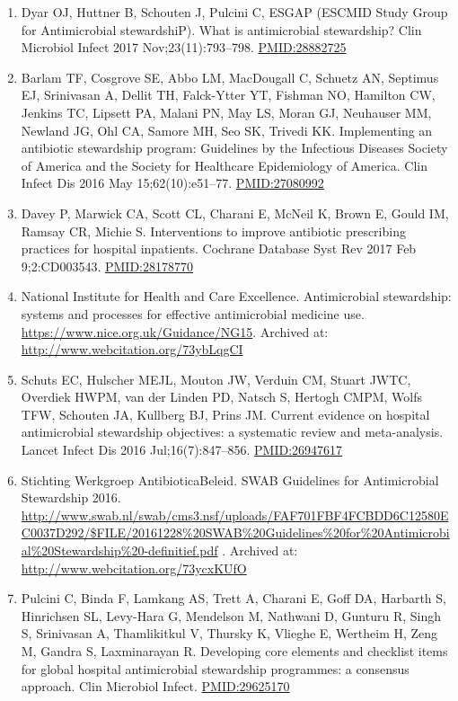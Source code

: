 \documentclass[
]{book}
\providecommand{\tightlist}{%
  \setlength{\itemsep}{0pt}\setlength{\parskip}{0pt}}
\begin{document}
\begin{enumerate}
\def\labelenumi{\arabic{enumi}.}
\tightlist
\item
  Dyar OJ, Huttner B, Schouten J, Pulcini C, ESGAP (ESCMID Study Group for Antimicrobial stewardshiP). What is antimicrobial stewardship? Clin Microbiol Infect 2017 Nov;23(11):793--798. \url{PMID:28882725}
\item
  Barlam TF, Cosgrove SE, Abbo LM, MacDougall C, Schuetz AN, Septimus EJ, Srinivasan A, Dellit TH, Falck-Ytter YT, Fishman NO, Hamilton CW, Jenkins TC, Lipsett PA, Malani PN, May LS, Moran GJ, Neuhauser MM, Newland JG, Ohl CA, Samore MH, Seo SK, Trivedi KK. Implementing an antibiotic stewardship program: Guidelines by the Infectious Diseases Society of America and the Society for Healthcare Epidemiology of America. Clin Infect Dis 2016 May 15;62(10):e51--77. \url{PMID:27080992}
\item
  Davey P, Marwick CA, Scott CL, Charani E, McNeil K, Brown E, Gould IM, Ramsay CR, Michie S. Interventions to improve antibiotic prescribing practices for hospital inpatients. Cochrane Database Syst Rev 2017 Feb 9;2:CD003543. \url{PMID:28178770}
\item
  National Institute for Health and Care Excellence. Antimicrobial stewardship: systems and processes for effective antimicrobial medicine use. \url{https://www.nice.org.uk/Guidance/NG15}. Archived at: \url{http://www.webcitation.org/73ybLqgCI}
\item
  Schuts EC, Hulscher MEJL, Mouton JW, Verduin CM, Stuart JWTC, Overdiek HWPM, van der Linden PD, Natsch S, Hertogh CMPM, Wolfs TFW, Schouten JA, Kullberg BJ, Prins JM. Current evidence on hospital antimicrobial stewardship objectives: a systematic review and meta-analysis. Lancet Infect Dis 2016 Jul;16(7):847--856. \url{PMID:26947617}
\item
  Stichting Werkgroep AntibioticaBeleid. SWAB Guidelines for Antimicrobial Stewardship 2016. \url{http://www.swab.nl/swab/cms3.nsf/uploads/FAF701FBF4FCBDD6C12580EC0037D292/$FILE/20161228\%20SWAB\%20Guidelines\%20for\%20Antimicrobial\%20Stewardship\%20-definitief.pdf} . Archived at: \url{http://www.webcitation.org/73ycxKUfO}
\item
  Pulcini C, Binda F, Lamkang AS, Trett A, Charani E, Goff DA, Harbarth S, Hinrichsen SL, Levy-Hara G, Mendelson M, Nathwani D, Gunturu R, Singh S, Srinivasan A, Thamlikitkul V, Thursky K, Vlieghe E, Wertheim H, Zeng M, Gandra S, Laxminarayan R. Developing core elements and checklist items for global hospital antimicrobial stewardship programmes: a consensus approach. Clin Microbiol Infect. \url{PMID:29625170}

\end{enumerate}
\end{document}
